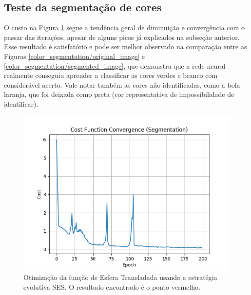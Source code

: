 \documentclass[conference]{IEEEtran}
\begin{document}
\subsection{Teste da segmentação de cores}

O custo na Figura \ref{color_segmentation/cost_function_convergence_segmentation} segue a tendência geral de diminuição e convergência com o passar das iterações, apesar de alguns picos já explicados na subseção anterior. Esse resultado é satisfatório e pode ser melhor observado na comparação entre as Figuras \ref{color_segmentation/original_image} e \ref{color_segmentation/segmented_image}, que demonstra que a rede neural realmente conseguiu aprender a classificar as cores verdes e branco com considerável acerto. Vale notar também as cores não identificadas, como a bola laranja, que foi deixada como preta (cor representativa de impossibilidade de identificar).

\begin{figure}[htbp]
\centering
\centerline{\includegraphics[scale=0.5]{imagens/color_segmentation/cost_function_convergence_segmentation.png}}
\caption{Otimização da função de Esfera Transladada usando a estratégia evolutiva SES. O resultado encontrado é o ponto vermelho.}
\label{color_segmentation/cost_function_convergence_segmentation}
\end{figure}
\end{document}

